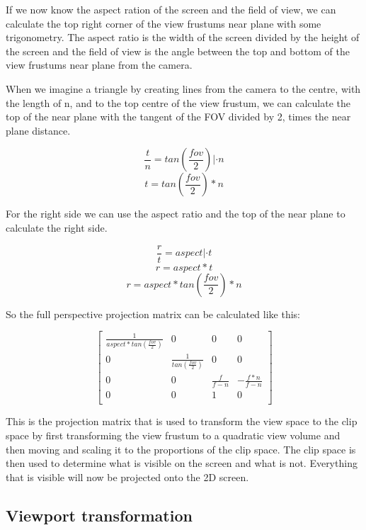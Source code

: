 \documentclass[12pt]{report} \usepackage{preamble}
\begin{document}
If we now know the aspect ration of the screen and the field of view, we can calculate the top right corner of the view frustums near plane
with some trigonometry. The aspect ratio is the width of the screen divided by the height of the screen and the field of view is the angle
between the top and bottom of the view frustums near plane from the camera.

When we imagine a triangle by creating lines from the camera to the centre, with the length of n,
and to the top centre of the view frustum, we can calculate the top of the near plane with
the tangent of the FOV divided by 2, times the near plane distance.

\[
	\frac{t}{n} = tan(\frac{fov}{2}) | \cdot n
\]
\[
	t = tan(\frac{fov}{2}) * n
\]

For the right side we can use the aspect ratio and the top of the near plane to calculate the right side.

\[
	\frac{r}{t} = aspect | \cdot t
\]
\[
	r = aspect * t
\]
\[
	r = aspect * tan(\frac{fov}{2}) * n
\]

So the full perspective projection matrix can be calculated like this:

\[
	\begin{bmatrix}
		\frac{1}{aspect * tan(\frac{fov}{2})} & 0                            & 0               & 0                    \\
		0                                     & \frac{1}{tan(\frac{fov}{2})} & 0               & 0                    \\
		0                                     & 0                            & \frac{f}{f - n} & -\frac{f * n}{f - n} \\
		0                                     & 0                            & 1               & 0                    \\
	\end{bmatrix}
\]

This is the projection matrix that is used to transform the view space to the clip space
by first transforming the view frustum to a quadratic view volume and then moving and scaling
it to the proportions of the clip space. The clip space is then used to determine what is visible on the screen and what is not.
Everything that is visible will now be projected onto the 2D screen.

\subsection{Viewport transformation}
\end{document}
